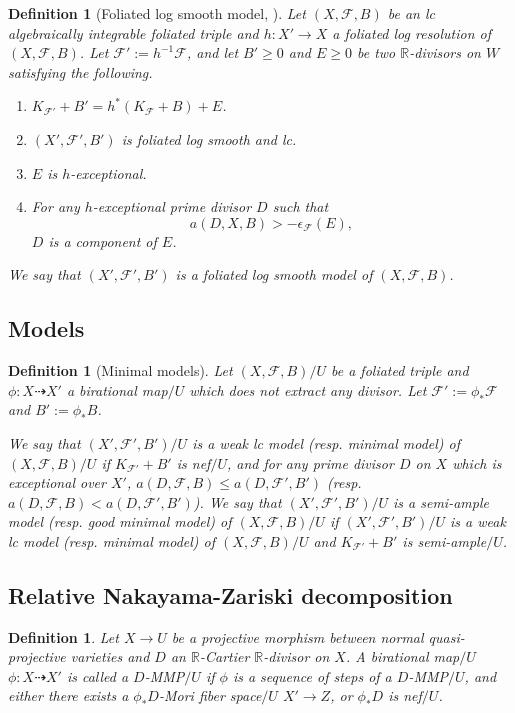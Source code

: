 \documentclass[preprint,12pt]{elsarticle}
\newcommand{\Rr}{\mathbb{R}}
\newcommand{\Ff}{\mathcal{F}}
\newtheorem{defn}[thm]{Definition}
\begin{document}
\begin{defn}[Foliated log smooth model,{ \cite[Definition 4.10]{LMX24b}}]\label{defn: log smooth models}
Let $(X,\Ff,B)$ be an lc algebraically integrable foliated triple and $h: X'\rightarrow X$ a foliated log resolution of $(X,\Ff,B)$. Let $\Ff':=h^{-1}\Ff$, and let $B'\geq 0$ and $E\geq 0$ be two $\Rr$-divisors on $W$ satisfying the following.
\begin{enumerate}
    \item $K_{\Ff'}+B'=h^*(K_\Ff+B)+E$.
    \item $(X',\Ff',B')$ is foliated log smooth and lc.
    \item $E$ is $h$-exceptional.
    \item For any $h$-exceptional prime divisor $D$ such that $$a(D,X,B)>-\epsilon_{\Ff}(E),$$ $D$ is a component of $E$.
\end{enumerate}
We say that $(X',\Ff',B')$ is a \emph{foliated log smooth model} of $(X,\Ff,B)$. 
\end{defn}

\subsection{Models}

\begin{defn}[Minimal models]\label{defn: minimal model}
Let $(X,\Ff,B)/U$ be a foliated triple and $\phi: X\dashrightarrow X'$ a birational map$/U$ which does not extract any divisor. Let $\Ff':=\phi_*\Ff$ and $B':=\phi_*B$. 

We say that $(X',\Ff',B')/U$ is a \emph{weak lc model} (resp. \emph{minimal model}) of $(X,\Ff,B)/U$ if $K_{\Ff'}+B'$ is nef$/U$, and for any prime divisor $D$ on $X$ which is exceptional over $X'$, $a(D,\Ff,B)\leq a(D,\Ff',B')$ (resp. $a(D,\Ff,B)<a(D,\Ff',B')$). We say that $(X',\Ff',B')/U$ is a \emph{semi-ample model} (resp. \emph{good minimal model}) of $(X,\Ff,B)/U$ if $(X',\Ff',B')/U$ is a weak lc model (resp. minimal model) of $(X,\Ff,B)/U$ and $K_{\Ff'}+B'$ is semi-ample$/U$.
\end{defn}




\subsection{Relative Nakayama-Zariski decomposition}


\begin{defn}
    Let $X\rightarrow U$ be a projective morphism between normal quasi-projective varieties and $D$ an $\Rr$-Cartier $\Rr$-divisor on $X$. A birational map$/U$ $\phi: X\dashrightarrow X'$ is called a $D$-MMP$/U$ if $\phi$ is a sequence of steps of a $D$-MMP$/U$, and either there exists a $\phi_*D$-Mori fiber space$/U$ $X'\rightarrow Z$, or $\phi_*D$ is nef$/U$.
\end{defn}
\end{document}
